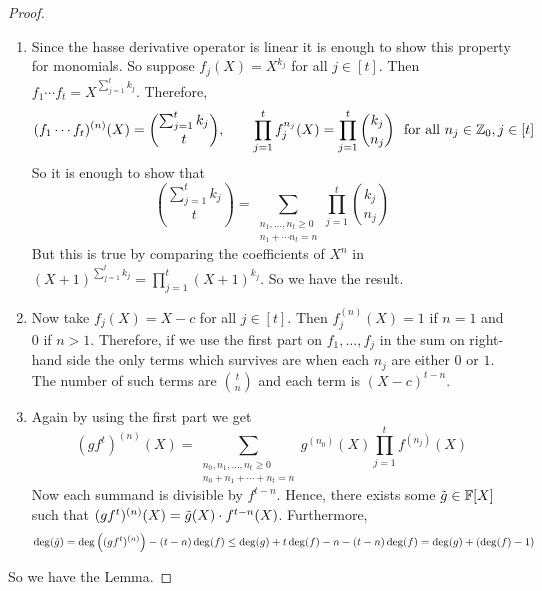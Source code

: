 \begin{proof}
  \begin{enumerate}[label=(\roman*)]
    \item Since the hasse derivative operator is linear it is enough to show this property for monomials. So suppose $f_j(X)=X^{k_j}$ for all $j\in[t]$. Then $f_1\cdots f_t=X^{\sum_{j=1}^t k_j}$. Therefore, $$(f_1\cdots f_t)^{(n)}(X)=\binom{\sum_{j=1}^t k_j}t,\qquad \prod_{j=1}^t f_j^{n_j}(X)=\prod_{j=1}^t \binom{k_j}{n_j}\ \text{ for all }n_j\in \mathbb{Z}_0, j\in[t]$$So it is enough to show that $$\binom{\sum_{j=1}^t k_j}t=\sum_{\substack{n_1,\dots, n_t\geq 0\\ n_1+\cdots n_t=n}}\prod_{j=1}^t \binom{k_j}{n_j}$$But this is true by comparing the coefficients of $X^n$ in $(X+1)^{\sum_{j=1}^t k_j}=\prod_{j=1}^t(X+1)^{k_j}$. So we have the result.
    \item Now take $f_j(X)=X-c$ for all $j\in[t]$. Then $f_j^{(n)}(X)=1$ if $n=1$ and $0$ if $n>1$. Therefore, if we use the first part on $f_1,\dots, f_j$ in the sum on right-hand side the only terms which survives are when each $n_j$ are either $0$ or $1$. The number of such terms are $\binom{t}n$ and each term is $(X-c)^{t-n}$.
    \item Again by using the first part we get $$(gf^t)^{(n)}(X)=\sum_{\substack{n_0,n_1,\dots, n_t\geq 0\\ n_0+n_1+\cdots +n_t=n}}g^{(n_0)}(X)\prod_{j=1}^t f^{(n_j)}(X)$$Now each summand is divisible by $f^{t-n}$. Hence, there exists some $\tilde{g}\in\mathbb{F}[X]$ such that  $(gf^t)^{(n)}(X)=\tilde{g}(X)\cdot f^{t-n}(X)$. Furthermore, $$\deg(\tilde{g})=\deg\left( (gf^{t})^{(n)}\right)-(t-n)\deg(f)\leq\deg(g)+t\deg(f)-n-(t-n)\deg(f)=\deg(g)+(\deg(f)-1)$$
  \end{enumerate}
  So we have the Lemma.
\end{proof}

